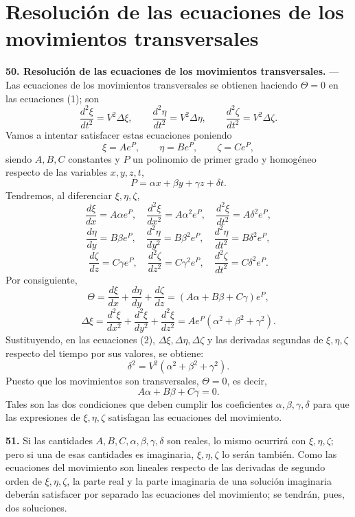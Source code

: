 \section{Resolución de las ecuaciones de los movimientos transversales}

\noindent\textbf{50. Resolución de las ecuaciones de los movimientos
transversales.} — Las ecuaciones de los movimientos transversales se
obtienen haciendo $\Theta=0$ en las ecuaciones (1); son
\begin{equation}
\frac{d^2\xi}{dt^2}=V^2\Delta\xi,\qquad
\frac{d^2\eta}{dt^2}=V^2\Delta\eta,\qquad
\frac{d^2\zeta}{dt^2}=V^2\Delta\zeta.
\tag{2}
\end{equation}
Vamos a intentar satisfacer estas ecuaciones poniendo
\[
\xi=Ae^P,\qquad \eta=Be^P,\qquad \zeta=Ce^P,
\]
siendo $A,B,C$ constantes y $P$ un polinomio de primer grado y homogéneo
respecto de las variables $x,y,z,t$,
\[
P=\alpha x+\beta y+\gamma z+\delta t.
\]
Tendremos, al diferenciar $\xi,\eta,\zeta$,
\[
\frac{d\xi}{dx}=A\alpha e^P,\quad \frac{d^2\xi}{dx^2}=A\alpha^2 e^P,\quad
\frac{d^2\xi}{dt^2}=A\delta^2 e^P,
\]
\[
\frac{d\eta}{dy}=B\beta e^P,\quad \frac{d^2\eta}{dy^2}=B\beta^2 e^P,\quad
\frac{d^2\eta}{dt^2}=B\delta^2 e^P,
\]
\[
\frac{d\zeta}{dz}=C\gamma e^P,\quad \frac{d^2\zeta}{dz^2}=C\gamma^2 e^P,\quad
\frac{d^2\zeta}{dt^2}=C\delta^2 e^P.
\]
Por consiguiente,
\[
\Theta=\frac{d\xi}{dx}+\frac{d\eta}{dy}+\frac{d\zeta}{dz}
=(A\alpha+B\beta+C\gamma)e^P,
\]
\[
\Delta\xi=\frac{d^2\xi}{dx^2}+\frac{d^2\xi}{dy^2}+\frac{d^2\xi}{dz^2}
=Ae^P(\alpha^2+\beta^2+\gamma^2).
\]
Sustituyendo, en las ecuaciones (2), $\Delta\xi,\Delta\eta,
\Delta\zeta$ y las derivadas segundas de $\xi,\eta,\zeta$ respecto del
tiempo por sus valores, se obtiene:
\[
\delta^2=V^2(\alpha^2+\beta^2+\gamma^2).
\]
Puesto que los movimientos son transversales, $\Theta=0$, es decir,
\[
A\alpha+B\beta+C\gamma=0.
\]
Tales son las dos condiciones que deben cumplir los coeficientes
$\alpha,\beta,\gamma,\delta$ para que las expresiones de $\xi,\eta,\zeta$
satisfagan las ecuaciones del movimiento.

\noindent\textbf{51.} Si las cantidades $A,B,C,\alpha,\beta,\gamma,\delta$
son reales, lo mismo ocurrirá con $\xi,\eta,\zeta$; pero si una de esas
cantidades es imaginaria, $\xi,\eta,\zeta$ lo serán también. Como las
ecuaciones del movimiento son lineales respecto de las derivadas de
segundo orden de $\xi,\eta,\zeta$, la parte real y la parte imaginaria de
una solución imaginaria deberán satisfacer por separado las ecuaciones
del movimiento; se tendrán, pues, dos soluciones.

